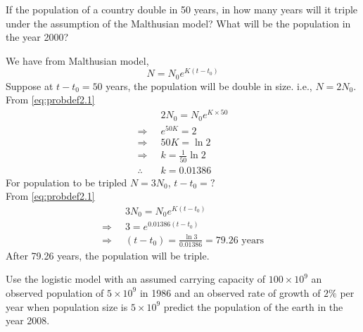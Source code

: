 \documentclass[../main-sheet.tex]{subfiles}
\begin{document}
\begin{prob}
    If the population of a country double in 50 years, in how many years will it triple under the assumption of the Malthusian model? What will be the population in the year 2000?
\end{prob}
\begin{soln}
    We have from Malthusian model,
    \begin{equation}
        N=N_0e^{K(t-t_0)}\label{eq:probdef2.1}
    \end{equation}
    Suppose at \(t-t_0=50\) years, the population will be double in size. i.e., \(N=2N_0\).\\
    From \eqref{eq:probdef2.1} 
    \begin{align*}
        &2N_0=N_0 e^{K\times 50}\\
        \Rightarrow\;\;& e^{50K}=2\\
        \Rightarrow\;\;& {50K}=\ln 2\\
        \Rightarrow\;\;& k=\frac{1}{50}\ln 2\\
        \therefore\;\;& k=0.01386
    \end{align*}
    For population to be tripled \(N=3N_0\), \(t-t_0=?\)\\
    From \eqref{eq:probdef2.1} 
    \begin{align*}
        &3N_0=N_0 e^{K(t-t_0)}\\
        \Rightarrow\;\;&3= e^{0.01386(t-t_0)}\\
        \Rightarrow\;\;& (t-t_0)=\frac{\ln 3}{0.01386}=79.26\text{ years}
    \end{align*}
    After 79.26 years, the population will be triple.
\end{soln}
\begin{prob}
    Use the logistic model with an assumed carrying capacity of \(100\times 10^9\) an observed population of \(5\times 10^9\) in 1986 and an observed rate of growth of \(2\%\) per year when population size is \(5 \times 10^9\) predict the population of the earth in the year 2008.
\end{prob}
\end{document}
